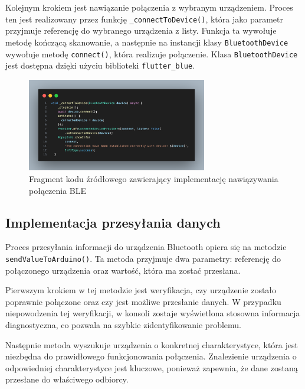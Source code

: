 \documentclass{report}
\begin{document}
Kolejnym krokiem jest nawiązanie połączenia z wybranym urządzeniem. Proces ten jest realizowany przez funkcję \texttt{\_connectToDevice()}, która jako parametr przyjmuje referencję do wybranego urządzenia z listy. Funkcja ta wywołuje metodę kończącą skanowanie, a następnie na instancji klasy \texttt{BluetoothDevice} wywołuje metodę \texttt{connect()}, która realizuje połączenie. Klasa \texttt{BluetoothDevice} jest dostępna dzięki użyciu biblioteki \texttt{flutter\_blue}.

\begin{figure}[H]
    \centering
    \includegraphics[width=0.7\textwidth]{src/app/connect.png}
    \caption{Fragment kodu źródłowego zawierający implementację nawiązywania połączenia BLE}
    \label{fig:con-soft}
\end{figure}


\subsection{\Large Implementacja przesyłania danych}
%
%

Proces przesyłania informacji do urządzenia Bluetooth opiera się na metodzie \texttt{sendValueToArduino()}. Ta metoda przyjmuje dwa parametry: referencję do połączonego urządzenia oraz wartość, która ma zostać przesłana.

Pierwszym krokiem w tej metodzie jest weryfikacja, czy urządzenie zostało poprawnie połączone oraz czy jest możliwe przesłanie danych. W przypadku niepowodzenia tej weryfikacji, w konsoli zostaje wyświetlona stosowna informacja diagnostyczna, co pozwala na szybkie zidentyfikowanie problemu.

Następnie metoda wyszukuje urządzenia o konkretnej charakterystyce, która jest niezbędna do prawidłowego funkcjonowania połączenia. Znalezienie urządzenia o odpowiedniej charakterystyce jest kluczowe, ponieważ zapewnia, że dane zostaną przesłane do właściwego odbiorcy.
\end{document}

